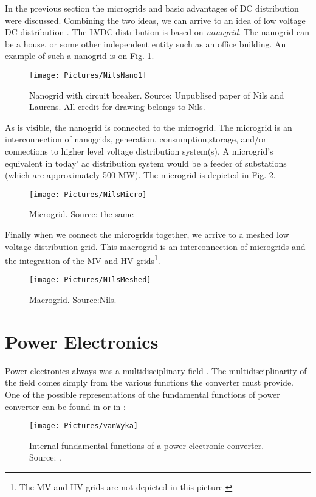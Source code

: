 \documentclass[]{scrartcl}
\begin{document}
In the previous section the microgrids and basic advantages of DC distribution were discussed. Combining the two ideas, we can arrive to an idea of low voltage DC distribution \cite{Mackay2015b}. The LVDC distribution is based on \emph{nanogrid}\cite{Mackay2015a}. The nanogrid can be a house, or some other independent entity such as an office building. An example of such a nanogrid is on Fig. \ref{fig:nilsnano1}.
\begin{figure}[h!]
\centering
\texttt{[image: Pictures/NilsNano1]}
\caption{Nanogrid with circuit breaker. Source: Unpublised paper of Nils and Laurens. All credit for drawing belongs to Nils.}
\label{fig:nilsnano1}
\end{figure}

As is visible, the nanogrid is connected to the microgrid. The microgrid is an interconnection of nanogrids, generation, consumption,storage, and/or connections to higher level voltage distribution
system(s). A microgrid’s equivalent in today' ac distribution system would be a feeder of substations (which are approximately 500 MW). The microgrid is depicted in Fig. \ref{fig:nilsmicro}.

\begin{figure}[h!]
\centering
\texttt{[image: Pictures/NilsMicro]}
\caption{Microgrid. Source: the same}
\label{fig:nilsmicro}
\end{figure}

Finally when we connect the microgrids together, we arrive to a meshed low voltage distribution grid.
This macrogrid is an interconnection of microgrids and the integration of the MV and HV grids\footnote{The MV and HV grids are not depicted in this picture.}.
\begin{figure}[h!]
\centering
\texttt{[image: Pictures/NIlsMeshed]}
\caption{Macrogrid. Source:Nils.}
\label{fig:nilsmeshed}
\end{figure}



\newpage
\section{Power Electronics}


Power electronics always was a multidisciplinary field \cite{Technology2015}. The multidisciplinarity of the field comes simply from the various functions the converter must provide. One of the possible representations of the fundamental functions of power converter can be found in \cite{Wyk2012} or in \cite{VanWyk2013}: 
\begin{figure}[h!]
\centering
\texttt{[image: Pictures/vanWyka]}
\caption{Internal fundamental functions of a power electronic converter. Source: \cite{Wyk2012}.}
\label{fig:vanwyka}
\end{figure}
\end{document}

